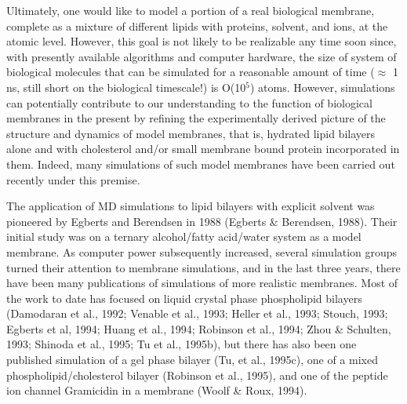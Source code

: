 Ultimately, one would like to model a portion of a real biological
membrane, complete as a mixture of different lipids with proteins,
solvent, and ions, at the atomic level.
However, this goal is not likely to be realizable any time soon since,
with presently available algorithms and computer hardware,
the size of system of biological molecules that can be simulated
for a reasonable amount of time ($\approx$ 1 ns, still short on
the biological timescale!) is O(10$^5$) atoms.
However, simulations can potentially contribute to our understanding
to the function of biological membranes in the present
by refining the experimentally derived picture of the structure
and dynamics of model membranes, that is, hydrated lipid bilayers
alone and with cholesterol and/or small membrane bound protein
incorporated in them.  Indeed, many simulations of such model membranes
have been carried out recently under this premise.

The application of MD simulations to lipid bilayers with explicit
solvent was pioneered by Egberts and Berendsen in 1988 (Egberts \&
Berendsen, 1988).
Their initial study was on a ternary alcohol/fatty acid/water
system as a model membrane. As computer power subsequently increased,
several simulation groups turned their attention to membrane simulations,
and in the last three years, there have been many publications of
simulations of more realistic membranes.  Most of the work to date has
focused on liquid crystal phase phospholipid bilayers
(Damodaran et al., 1992; Venable et al., 1993; Heller et al., 1993;
Stouch, 1993; Egberts et al, 1994; Huang et al., 1994; Robinson et al.,
1994; Zhou \& Schulten, 1993; Shinoda et al., 1995; Tu et al., 1995b), 
but there has also been one published simulation of a gel phase bilayer
(Tu, et al., 1995c), one of a mixed phospholipid/cholesterol bilayer
(Robinson et al., 1995), and one of the peptide ion channel Gramicidin in
a membrane (Woolf \& Roux, 1994).

